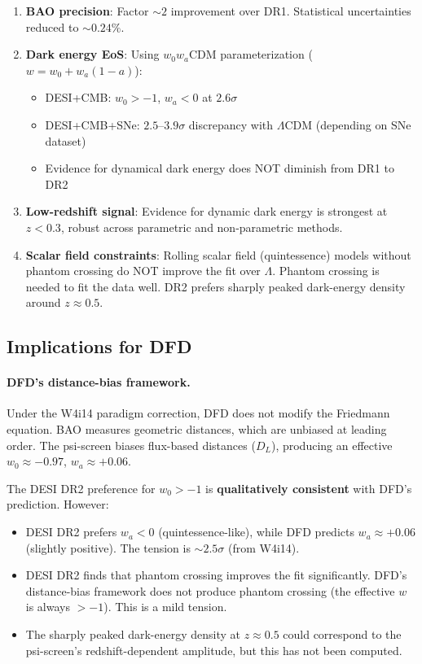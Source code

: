 \documentclass[11pt]{article}
\begin{document}
\begin{enumerate}
\item \textbf{BAO precision}: Factor $\sim 2$ improvement over DR1.
  Statistical uncertainties reduced to $\sim 0.24\%$.

\item \textbf{Dark energy EoS}: Using $w_0w_a$CDM parameterization
  ($w = w_0 + w_a(1-a)$):
  \begin{itemize}
  \item DESI+CMB: $w_0 > -1$, $w_a < 0$ at $2.6\sigma$
  \item DESI+CMB+SNe: $2.5$--$3.9\sigma$ discrepancy with $\Lambda$CDM
    (depending on SNe dataset)
  \item Evidence for dynamical dark energy does NOT diminish from DR1 to DR2
  \end{itemize}

\item \textbf{Low-redshift signal}: Evidence for dynamic dark energy
  is strongest at $z < 0.3$, robust across parametric and non-parametric
  methods.

\item \textbf{Scalar field constraints}: Rolling scalar field
  (quintessence) models without phantom crossing do NOT improve the
  fit over $\Lambda$. Phantom crossing is needed to fit the data well.
  DR2 prefers sharply peaked dark-energy density around $z \approx 0.5$.
\end{enumerate}

\subsection{Implications for DFD}

\paragraph{DFD's distance-bias framework.}
Under the W4i14 paradigm correction, DFD does not modify the Friedmann
equation. BAO measures geometric distances, which are unbiased at leading
order. The psi-screen biases flux-based distances ($D_L$), producing an
effective $w_0 \approx -0.97$, $w_a \approx +0.06$.

The DESI DR2 preference for $w_0 > -1$ is \textbf{qualitatively consistent}
with DFD's prediction. However:
\begin{itemize}
\item DESI DR2 prefers $w_a < 0$ (quintessence-like), while DFD predicts
  $w_a \approx +0.06$ (slightly positive). The tension is $\sim 2.5\sigma$
  (from W4i14).
\item DESI DR2 finds that phantom crossing improves the fit significantly.
  DFD's distance-bias framework does not produce phantom crossing
  (the effective $w$ is always $> -1$). This is a mild tension.
\item The sharply peaked dark-energy density at $z \approx 0.5$ could
  correspond to the psi-screen's redshift-dependent amplitude, but this
  has not been computed.
\end{itemize}
\end{document}
